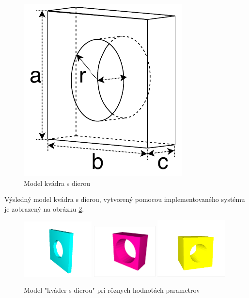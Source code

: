 \begin{figure}[H]
	\centering
	\includegraphics[height=0.3\textwidth]{obrazky-figures/Examples/A4x.pdf}
	\caption{Model kvádra s dierou}
	\label{fig:A4vyhodnotenie}
\end{figure}

Výsledný model kvádra s dierou, vytvorený pomocou implementovaného systému je zobrazený na obrázku \ref{fig:qwerty7io}.

\begin{figure}[H]
	\centering
	\includegraphics[trim=10 10 10 10,clip,width=0.33\textwidth]{obrazky-figures/Examples/kvader s dierou1.png}
	\includegraphics[trim=10 10 10 10,clip,width=0.30\textwidth]{obrazky-figures/Examples/kvader s dierou2.png}
	\includegraphics[trim=10 10 10 10,clip,width=0.33\textwidth]{obrazky-figures/Examples/kvader s dierou3.png}
	\caption{Model "kváder s dierou" pri rôznych hodnotách parametrov}
	\label{fig:qwerty7io}
\end{figure}

